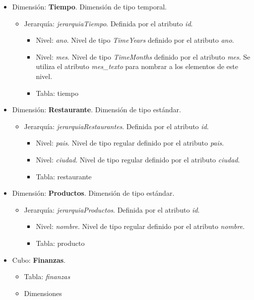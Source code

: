 \documentclass[11pt]{opticajnl}
\begin{document}
\begin{itemize}
\item Dimensión: \textbf{Tiempo}. Dimensión de tipo temporal.
\begin{itemize}
\item Jerarquía: \textit{jerarquiaTiempo}. Definida por el atributo \textit{id}. 
\begin{itemize}
\item Nivel: \textit{ano}. Nivel de tipo \textit{TimeYears} definido por el atributo \textit{ano}.
\item Nivel: \textit{mes}. Nivel de tipo \textit{TimeMonths} definido por el atributo \textit{mes}. Se utiliza el atributo \textit{mes\_texto} para nombrar a los elementos de este nivel.
\item Tabla: tiempo
\end{itemize}
\end{itemize}
\item Dimensión: \textbf{Restaurante}. Dimensión de tipo estándar.
\begin{itemize}
\item Jerarquía: \textit{jerarquiaRestaurantes}. Definida por el atributo \textit{id}.
\begin{itemize}
\item Nivel: \textit{pais}. Nivel de tipo regular definido por el atributo \textit{pais}.
\item Nivel: \textit{ciudad}. Nivel de tipo regular definido por el atributo \textit{ciudad}.
\item Tabla: restaurante
\end{itemize}
\end{itemize}
\item Dimensión: \textbf{Productos}. Dimensión de tipo estándar.
\begin{itemize}
\item Jerarquía: \textit{jerarquiaProductos}. Definida por el atributo \textit{id}.
\begin{itemize}
\item Nivel: \textit{nombre}. Nivel de tipo regular definido por el atributo \textit{nombre}.
\item Tabla: producto
\end{itemize}
\end{itemize}
\item Cubo: \textbf{Finanzas}. 
\begin{itemize}
\item Tabla: \textit{finanzas}
\item Dimensiones 

\end{itemize}
\end{itemize}
\end{document}
